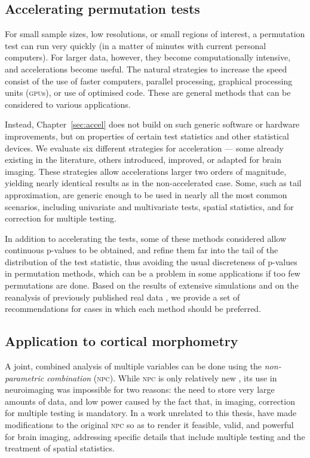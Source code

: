 \subsection{Accelerating permutation tests}

For small sample sizes, low resolutions, or small regions of interest, a permutation test can run very quickly (in a matter of minutes with current personal computers). For larger data, however, they become computationally intensive, and accelerations become useful. The natural strategies to increase the speed consist of the use of faster computers, parallel processing, graphical processing units (\textsc{gpu}s), or use of optimised code. These are general methods that can be considered to various applications.

Instead, Chapter~\ref{sec:accel} does not build on such generic software or hardware improvements, but on properties of certain test statistics and other statistical devices. We evaluate six different strategies for acceleration --- some already existing in the literature, others introduced, improved, or adapted for brain imaging. These strategies allow accelerations larger two orders of magnitude, yielding nearly identical results as in the non-accelerated case. Some, such as tail approximation, are generic enough to be used in nearly all the most common scenarios, including univariate and multivariate tests, spatial statistics, and for correction for multiple testing.

In addition to accelerating the tests, some of these methods considered allow continuous p-values to be obtained, and refine them far into the tail of the distribution of the test statistic, thus avoiding the usual discreteness of p-values in permutation methods, which can be a problem in some applications if too few permutations are done. Based on the results of extensive simulations and on the reanalysis of previously published real data \citep{Douaud2007}, we provide a set of recommendations for cases in which each method should be preferred.

\subsection{Application to cortical morphometry}

A joint, combined analysis of multiple variables can be done using the \emph{non-parametric combination} (\textsc{npc}). While \textsc{npc} is only relatively new \citep{Pesarin2010}, its use in neuroimaging was impossible for two reasons: the need to store very large amounts of data, and low power caused by the fact that, in imaging, correction for multiple testing is mandatory. In a work unrelated to this thesis, \citet{Winkler2016_npc} have made modifications to the original \textsc{npc} so as to render it feasible, valid, and powerful for brain imaging, addressing specific details that include multiple testing and the treatment of spatial statistics.

